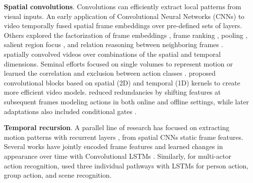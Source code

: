 \noindent
\textbf{Spatial convolutions}. Convolutions can efficiently extract local patterns from visual inputs. An early application of Convolutional Neural Networks (CNNs) to video \citep{karpathy2014large} temporally fused spatial frame embeddings over pre-defined sets of layers. Others explored the factorization of frame embeddings \citep{sun2015human}, frame ranking \citep{fernando2015modeling}, pooling \citep{fernando2016rank}, salient region focus \citep{girdhar2017attentional, zong2021motion}, and relation reasoning between neighboring frames \citep{zhou2018temporal}. \citet{le2011learning} spatially convolved videos over combinations of the spatial and temporal dimensions. Seminal efforts focused on single volumes to represent motion \citep{bilen2016dynamic,chung2016signs,iosifidis2012view} or learned the correlation and exclusion between action classes \citep{hoai2015improving}. \citet{tran2018closer} proposed convolutional blocks based on spatial (2D) and temporal (1D) kernels to create more efficient video models. \citet{lin2019tsm} reduced redundancies by shifting features at subsequent frames modeling actions in both online and offline settings, while later adaptations also included conditional gates \citep{sudhakaran2020gate}.

\noindent
\textbf{Temporal recursion}. A parallel line of research has focused on extracting motion patterns with recurrent layers \citep{ballas2015delving,dwibedi2018temporal,kapidis2019multitask,perrett2019ddlstm,yue2015beyond,ullah2017action}, from spatial CNNs static frame features. Several works have jointly encoded frame features and learned changes in appearance over time with Convolutional LSTMs \citep{donahue2015long,srivastava2015unsupervised}. Similarly, for multi-actor action recognition, \citet{wang2017recurrent} used three individual pathways with LSTMs for person action, group action, and scene recognition.


